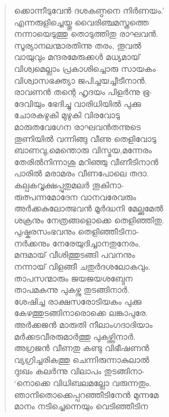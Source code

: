 \begin{verse}
ക്കൊന്നീടുവേന്‍ ദശകണ്ഠനെ നിര്‍ണയം.’\\
എന്നരുളിച്ചെയ്തു വൈരിഞ്ചമസ്ത്രത്തെ\\
നന്നായെടുത്തു തൊടുത്തിതു രാഘവന്‍.\\
സൂര്യാനലന്മാരതിന്നു തരം, തൂവല്‍\\
വായുവും മന്ദരമേരുക്കള്‍ മധ്യമായ്\\
വിശ്വമെല്ലാം പ്രകാശിച്ചൊരു സായകം\\
വിശ്വാസഭക്ത്യാ ജപിച്ചയച്ചീടീനാന്‍.\\
രാവണന്‍ തന്റെ ഹൃദയം പിളര്‍ന്നു ഭൂ-\\
ദേവിയും ഭേദിച്ചു വാരിധിയില്‍ പുക്കു\\
ചോരകഴുകി മുഴുകി വിരവോടു\\
മാരുതവേഗേന രാഘവന്‍തന്നുടെ\\
തൂണിയില്‍ വന്നിങ്ങു വീണു തെളിവോടു\\
ബാണവു,മെന്തൊരു വിസ്മയ,മന്നേരം\\
തേരില്‍നിന്നാശു മറിഞ്ഞു വീണീടിനാന്‍\\
പാരില്‍ മരാമരം വീണപോലെ തദാ.\\
കല്പകവൃക്ഷപ്പുതുമലര്‍ തൂകിനാ-\\
രുത്പന്നമോദേന വാനവരേവരും\\
അര്‍ക്കകുലോത്ഭവന്‍ മൂര്‍ദ്ധനി മേല്ക്കുമേല്‍\\
ശക്രനും നേത്രങ്ങളൊക്കെ തെളിഞ്ഞിതു.\\
പുഷ്കരസംഭവനും തെളിഞ്ഞീടിനാ-\\
നര്‍ക്കനും നേരേയുദിച്ചാനതുനേരം.\\
മന്ദമായ് വീശിത്തുടങ്ങി പവനനും\\
നന്നായ് വിളങ്ങീ ചതുര്‍ദശലോകവും.\\
താപസന്മാരും ജയജയശബ്ദേന\\
താപമകന്നു പുകഴ്ന്നു തുടങ്ങിനാര്‍.\\
ശേഷിച്ച രാക്ഷസരോടിയകം പുക്കു\\
കേഴത്തുടങ്ങിനാരൊക്കെ ലങ്കാപുരേ.\\
അര്‍ക്കജന്‍ മാരുതി നീലാംഗദാദിയാം\\
മര്‍ക്കടവീരരുമാര്‍ത്തു പുകഴ്ത്തിനാര്‍.\\
അഗ്രജന്‍ വീണതു കണ്ടു വിഭീഷണന്‍\\
വ്യഗ്രിച്ചരികത്തു ചെന്നിരുന്നാകുലാല്‍\\
ദുഃഖം കലര്‍ന്നു വിലാപം തുടങ്ങിനാ-\\
‘നൊക്കെ വിധിബലമല്ലോ വരുന്നതും.\\
ഞാനിതൊക്കെപ്പറഞ്ഞീടിനേന്‍ മുന്നമേ\\
മാനം നടിച്ചെന്നെയും വെടിഞ്ഞീടിന\\

\end{verse}
